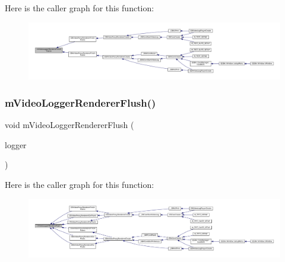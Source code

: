 Here is the caller graph for this function\+:
\nopagebreak
\begin{figure}[H]
\begin{center}
\leavevmode
\includegraphics[width=350pt]{video-logger_8c_ae0985d556c5cd2c11d95f3b0c8e820af_icgraph}
\end{center}
\end{figure}
\mbox{\label{video-logger_8c_a62188c3c2ee5b48e38f1f79431d50551}} 
\subsubsection{\texorpdfstring{m\+Video\+Logger\+Renderer\+Flush()}{mVideoLoggerRendererFlush()}}
{\footnotesize\ttfamily void m\+Video\+Logger\+Renderer\+Flush (\begin{DoxyParamCaption}\item[{struct m\+Video\+Logger $\ast$}]{logger }\end{DoxyParamCaption})}

Here is the caller graph for this function\+:
\nopagebreak
\begin{figure}[H]
\begin{center}
\leavevmode
\includegraphics[width=350pt]{video-logger_8c_a62188c3c2ee5b48e38f1f79431d50551_icgraph}
\end{center}
\end{figure}
\mbox{\label{video-logger_8c_a16bd9eb225160df41ea90b332634c267}} 
